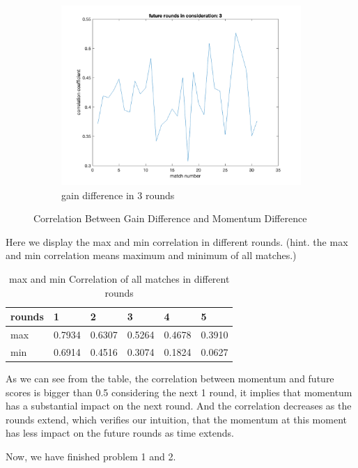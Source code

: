 \begin{figure}[H]
    \begin{subfigure}[b]{0.34\textwidth}
        \includegraphics[width=\linewidth]{mainmatter/imgs/momen_3points_cor.png}
        \caption{gain difference in 3 rounds}
    \end{subfigure}
    \caption{Correlation Between Gain Difference and Momentum Difference}
    \label{fig:Correlation}
\end{figure}

Here we display the max and min correlation in different rounds.
(hint. the max and min correlation means maximum and minimum of all matches.)

\begin{table}[!ht]
    \centering
    \begin{tabular}{|l|l|l|l|l|l|}
    \hline
        rounds & 1 & 2 & 3 & 4 & 5 \\ \hline
        max & 0.7934 & 0.6307 & 0.5264 & 0.4678 & 0.3910 \\ \hline
        min & 0.6914 & 0.4516 & 0.3074 & 0.1824 & 0.0627 \\ \hline
    \end{tabular}
    \caption{max and min Correlation of all matches in different rounds}
    \label{fig:maxmin Correlation}
\end{table}

As we can see from the table, the correlation between momentum and future scores is bigger
than 0.5 considering the next 1 round, it implies that momentum has a substantial impact on the next round.
And the correlation decreases as the rounds extend, which verifies our intuition, that
the momentum at this moment has less impact on the future rounds as time extends.

Now, we have finished problem 1 and 2.